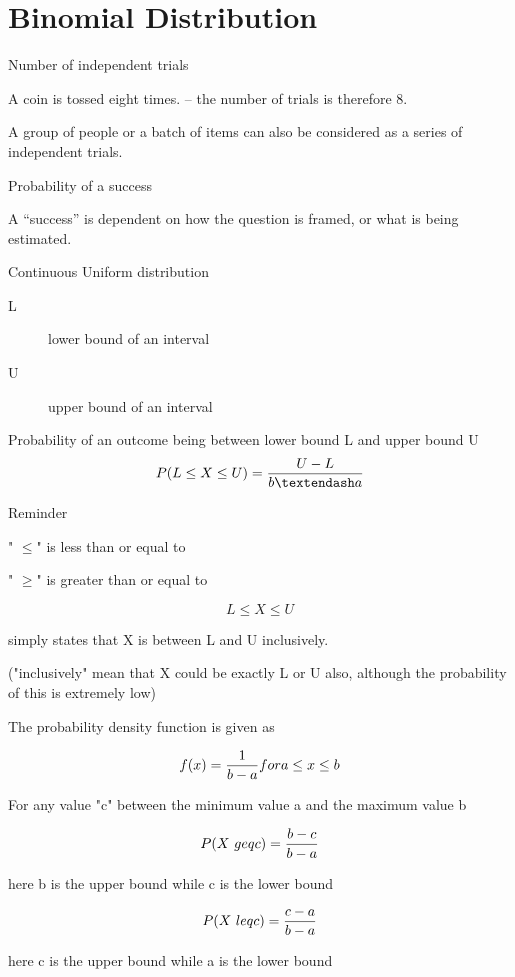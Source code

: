 \documentclass{beamer}
\begin{document}
\section{Binomial Distribution}
\begin{frame}	

	Number of independent trials
	
	A coin is tossed eight times. – the number of trials is therefore 8.
	
	A group of people or a batch of items can also be considered as a series of independent trials.
\end{frame}
\begin{frame} 
	Probability of a success
	
	A “success” is dependent on how the question is framed, or what is being estimated.

\end{frame}
\begin{frame}	
	Continuous Uniform distribution
	
\begin{description}
\item[L] lower bound of an interval
\item[U] upper bound of an interval
\end{description}
	Probability of an outcome being between lower bound L and upper bound U
	\[P( L \leq X \leq U)  =  { U - L \over  b – a }\]
\end{frame}
\begin{frame} 
	
	Reminder
	
	" $\leq$" is less than or equal to
	
	" $\geq$" is greater than or equal to
	
	
	\[L \leq X \leq U\]
	
	simply states that X is between L and U inclusively.
	
	("inclusively" mean that X could be exactly L or U also, although the probability of this is extremely low)
	
\end{frame}
\begin{frame} 
	The probability density function is given as
	
	\[f(x) = {1 \over b-a} for a \leq x \leq b\]
	
	For any value "c" between the minimum value a and the maximum value b
	
	\[P(X \ geq c) = {b-c \over b-a}\]
	
	here b is the upper bound while c is the lower bound
	
	
	\[P(X \ leq c) = {c-a \over b-a}\]
	
	here c is the upper bound while a is the lower bound
	
\end{frame}
\end{document}
